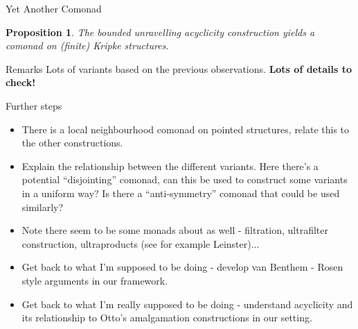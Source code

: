 \documentclass{beamer}
\newtheorem{proposition}{Proposition}
\begin{document}
\begin{frame}{Yet Another Comonad}
    \begin{proposition}
    The bounded unravelling acyclicity construction yields a comonad on (finite) Kripke structures.
    \end{proposition}
    \begin{block}{Remarks}
    Lots of variants based on the previous observations. {\bf Lots of details to check!}
    \end{block}
\end{frame}

\begin{frame}{Further steps}
    \begin{itemize}
        \item There is a local neighbourhood comonad on pointed structures, relate this to the other constructions.
        \item Explain the relationship between the different variants. Here there's a potential ``disjointing'' comonad, can this be used to construct some variants in a uniform way? Is there a ``anti-symmetry'' comonad that could be used similarly?
        \item Note there seem to be some monads about as well - filtration, ultrafilter construction, ultraproducts (see for example Leinster)...
        \pause
        \item Get back to what I'm supposed to be doing - develop van Benthem - Rosen style arguments in our framework.
        \pause
        \item Get back to what I'm really supposed to be doing - understand acyclicity and its relationship to Otto's amalgamation constructions in our setting.
    \end{itemize}
\end{frame}
\end{document}
